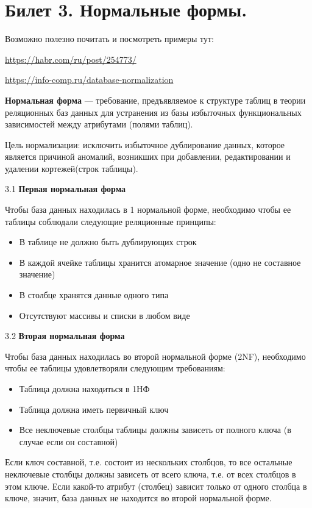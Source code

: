 \newpage
\section {Билет 3. Нормальные формы.}

Возможно полезно почитать и посмотреть примеры тут:

\url{https://habr.com/ru/post/254773/} 

\url{https://info-comp.ru/database-normalization}

\textbf{Нормальная форма} — требование, предъявляемое к структуре таблиц в теории реляционных баз данных для устранения из базы избыточных функциональных зависимостей между атрибутами (полями таблиц).

Цель нормализации: исключить избыточное дублирование данных, которое является причиной аномалий, возникших при добавлении, редактировании и удалении кортежей(строк таблицы).

3.1 \textbf{Первая нормальная форма}

Чтобы база данных находилась в 1 нормальной форме, необходимо чтобы ее таблицы соблюдали следующие реляционные принципы:

\begin{itemize}
	\item В таблице не должно быть дублирующих строк
	\item В каждой ячейке таблицы хранится атомарное значение (одно не составное значение)
	\item В столбце хранятся данные одного типа
	\item Отсутствуют массивы и списки в любом виде
\end{itemize}

3.2 \textbf{Вторая нормальная форма}

Чтобы база данных находилась во второй нормальной форме (2NF), необходимо чтобы ее таблицы удовлетворяли следующим требованиям:

\begin{itemize}
	\item Таблица должна находиться в 1НФ
	\item Таблица должна иметь первичный ключ
	\item Все неключевые столбцы таблицы должны зависеть от полного ключа (в случае если он составной)
\end{itemize}

Если ключ составной, т.е. состоит из нескольких столбцов, то все остальные неключевые столбцы должны зависеть от всего ключа, т.е. от всех столбцов в этом ключе. Если какой-то атрибут (столбец) зависит только от одного столбца в ключе, значит, база данных не находится во второй нормальной форме.

